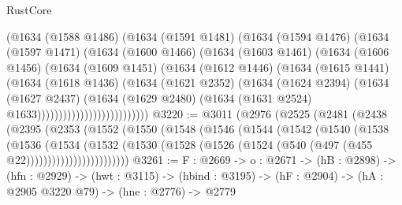 \begin{lexlean}{RustCore}
\begin{coremodule}
                        (@1634
                          (@1588 @1486)
                          (@1634
                            (@1591 @1481)
                            (@1634
                              (@1594 @1476)
                              (@1634
                                (@1597 @1471)
                                (@1634
                                  (@1600 @1466)
                                  (@1634
                                    (@1603 @1461)
                                    (@1634
                                      (@1606 @1456)
                                      (@1634
                                        (@1609 @1451)
                                        (@1634
                                          (@1612 @1446)
                                          (@1634
                                            (@1615 @1441)
                                            (@1634
                                              (@1618 @1436)
                                              (@1634
                                                (@1621 @2352)
                                                (@1634
                                                  (@1624 @2394)
                                                  (@1634
                                                    (@1627 @2437)
                                                    (@1634
                                                      (@1629 @2480)
                                                      (@1634
                                                        (@1631 @2524)
                                                        @1633))))))))))))))))))))))))))
@3220 := @3011
    (@2976
      (@2525
        (@2481
          (@2438
            (@2395
              (@2353
                (@1552
                  (@1550
                    (@1548
                      (@1546
                        (@1544
                          (@1542
                            (@1540
                              (@1538
                                (@1536
                                  (@1534
                                    (@1532
                                      (@1530
                                        (@1528
                                          (@1526
                                            (@1524 (@540 (@497 (@455 @22))))))))))))))))))))))))
@3261 := {F : @2669} ->
  {o : @2671} ->
  (hB : @2898) ->
  (hfn : @2929) ->
  (hwt : @3115) ->
  (hbind : @3195) ->
  (hF : @2904) ->
  (hA : @2905 @3220 @79) ->
  (hne : @2776) ->
  @2779

\end{coremodule}
\end{lexlean}
